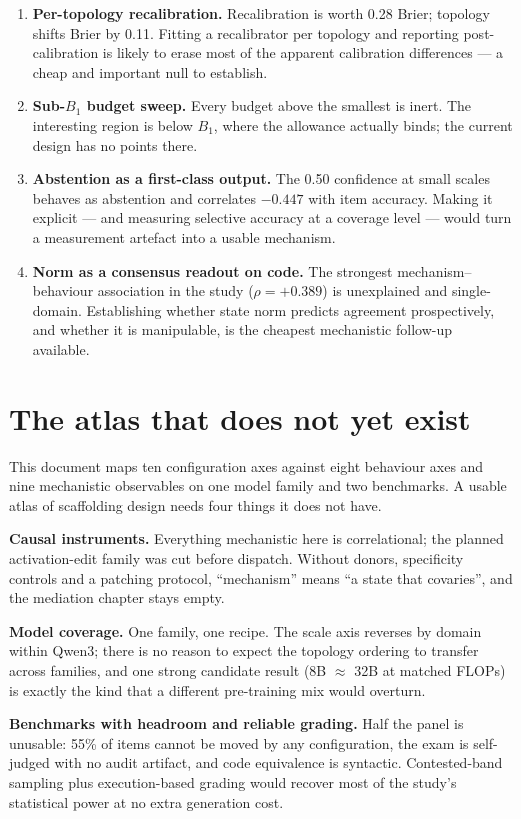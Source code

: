 \documentclass[10pt,a4paper]{article}
\begin{document}
\begin{enumerate}
\item \textbf{Per-topology recalibration.} Recalibration is worth 0.28 Brier; topology shifts Brier by 0.11. Fitting a recalibrator per topology and reporting post-calibration is likely to erase most of the apparent calibration differences --- a cheap and important null to establish.
\item \textbf{Sub-$B_1$ budget sweep.} Every budget above the smallest is inert. The interesting region is below $B_1$, where the allowance actually binds; the current design has no points there.
\item \textbf{Abstention as a first-class output.} The 0.50 confidence at small scales behaves as abstention and correlates $-0.447$ with item accuracy. Making it explicit --- and measuring selective accuracy at a coverage level --- would turn a measurement artefact into a usable mechanism.
\item \textbf{Norm as a consensus readout on code.} The strongest mechanism--behaviour association in the study ($\rho=+0.389$) is unexplained and single-domain. Establishing whether state norm predicts agreement prospectively, and whether it is manipulable, is the cheapest mechanistic follow-up available.
\end{enumerate}

\section{The atlas that does not yet exist}\label{sec:roadmap}

This document maps ten configuration axes against eight behaviour axes and nine mechanistic observables on one model family and two benchmarks. A usable atlas of scaffolding design needs four things it does not have.

\textbf{Causal instruments.} Everything mechanistic here is correlational; the planned activation-edit family was cut before dispatch. Without donors, specificity controls and a patching protocol, ``mechanism'' means ``a state that covaries'', and the mediation chapter stays empty.

\textbf{Model coverage.} One family, one recipe. The scale axis reverses by domain within Qwen3; there is no reason to expect the topology ordering to transfer across families, and one strong candidate result (8B $\approx$ 32B at matched FLOPs) is exactly the kind that a different pre-training mix would overturn.

\textbf{Benchmarks with headroom and reliable grading.} Half the panel is unusable: 55\% of items cannot be moved by any configuration, the exam is self-judged with no audit artifact, and code equivalence is syntactic. Contested-band sampling plus execution-based grading would recover most of the study's statistical power at no extra generation cost.
\end{document}
